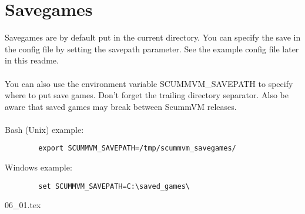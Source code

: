 \section {Savegames}
Savegames are by default put in the current directory. You can specify the save
in the config file by setting the savepath parameter. See the example config
file later in this readme.\\
~\\
You can also use the environment variable SCUMMVM\_SAVEPATH to specify where to
put save games. Don't forget the trailing directory separator. Also be aware
that saved games may break between ScummVM releases.\\
~\\
Bash (Unix) example:
\begin{verbatim}
        export SCUMMVM_SAVEPATH=/tmp/scummvm_savegames/
\end{verbatim}
Windows example:
\begin{verbatim}
        set SCUMMVM_SAVEPATH=C:\saved_games\
\end{verbatim}

 {06_01.tex}

